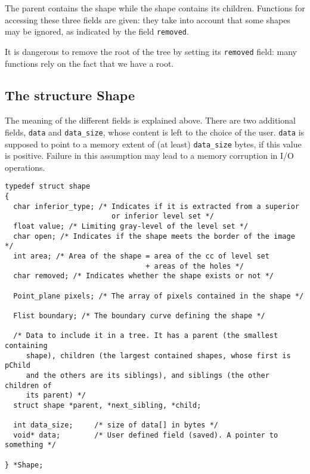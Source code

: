 The parent contains the shape while the shape contains its children. Functions
for accessing these three fields are given: they take into account that
some shapes may be ignored, as indicated by the field \verb+removed+.

It is dangerous to remove the root of the tree by setting its \verb+removed+
field: many functions rely on the fact that we have a root.

\subsection{The structure Shape}
\label{shape_structure}

The meaning of the different fields is explained above. There are two
additional fields, \verb+data+ and \verb+data_size+, whose content is left
to the choice of the user. \verb+data+ is supposed to point to a memory
extent of (at least) \verb+data_size+ bytes, if this value is
positive. Failure in this assumption may lead to a memory corruption in
I/O operations. 

{\small
\begin{verbatim}
typedef struct shape
{
  char inferior_type; /* Indicates if it is extracted from a superior 
                         or inferior level set */
  float value; /* Limiting gray-level of the level set */
  char open; /* Indicates if the shape meets the border of the image */
  int area; /* Area of the shape = area of the cc of level set 
                                 + areas of the holes */
  char removed; /* Indicates whether the shape exists or not */

  Point_plane pixels; /* The array of pixels contained in the shape */

  Flist boundary; /* The boundary curve defining the shape */

  /* Data to include it in a tree. It has a parent (the smallest containing 
     shape), children (the largest contained shapes, whose first is pChild 
     and the others are its siblings), and siblings (the other children of 
     its parent) */
  struct shape *parent, *next_sibling, *child;

  int data_size;     /* size of data[] in bytes */
  void* data;        /* User defined field (saved). A pointer to something */

} *Shape;
\end{verbatim}
}

